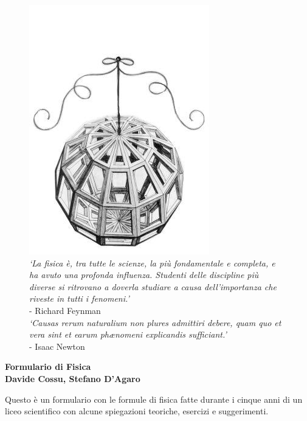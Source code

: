\documentclass[8pt, a4paper, twocolumn, twoside,usenames]{extarticle}
\begin{document}
\thispagestyle{firststyle}
\onecolumn
\begin{@twocolumnfalse}
  \clearpage
  \begin{center}
    \begin{figure}[!h]
      \centering
      \captionsetup{justification=centering}
      \includegraphics[scale=3]{colophon/daVinci}
      \caption{\textit{`La fisica è, tra tutte le scienze, la più fondamentale e completa,
          e ha avuto una profonda influenza. Studenti delle discipline più diverse si 
          ritrovano a doverla studiare a causa dell'importanza che riveste in tutti i 
        fenomeni.'}\\- Richard Feynman\\ [\baselineskip]
        \textit{`Causas rerum naturalium non plures admittiri debere, quam quo et vera 
      sint et earum ph\ae nomeni explicandis sufficiant.'}\\- Isaac Newton}
      \label{fig:deer}
    \end{figure}
    \vspace{1cm}
    \begin{minipage}{.6\textwidth}				
      \begin{center}
        {\Huge\textbf{Formulario di Fisica}}\\\vspace{0.2cm}
        {\textbf{Davide Cossu, Stefano D'Agaro}}
      \end{center}
      \vspace{0.5cm}
      Questo è un formulario con le formule di fisica fatte durante i cinque anni 
      di un liceo scientifico con alcune spiegazioni teoriche, esercizi e suggerimenti.
    \end{minipage}
  \end{center}
  \clearpage
\end{@twocolumnfalse}
\end{document}
